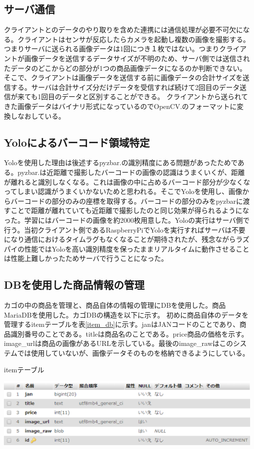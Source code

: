 \newpage

\subsection*{サーバ通信}
クライアントとのデータのやり取りを含めた連携には通信処理が必要不可欠になる。クライアントはセンサが反応したらカメラを起動し複数の画像を撮影する。つまりサーバに送られる画像データは1回につき１枚ではない。つまりクライアントが画像データを送信するデータサイズが不明のため、サーバ側では送信されたデータのどこからどの部分が1つの商品画像データになるのか判断できない。そこで、クライアントは画像データを送信する前に画像データの合計サイズを送信する。サーバは合計サイズ分だけデータを受信すれば続けて2回目のデータ送信が来ても1回目のデータと区別することができる。
クライアントから送られてきた画像データはバイナリ形式になっているのでOpenCV\cite{opencv}.のフォーマットに変換しなおしている。

\subsection*{Yoloによるバーコード領域特定}
Yoloを使用した理由は後述するpyzbar\cite{pyzbar}.の識別精度にある問題があったためである。pyzbar\cite{pyzbar}.は近距離で撮影したバーコードの画像の認識はうまくいくが、距離が離れると識別しなくなる。これは画像の中に占めるバーコード部分が少なくなってしまい認識がうまくいかないためと思われる。そこでYoloを使用し、画像からバーコードの部分のみの座標を取得する。バーコードの部分のみをpyzbarに渡すことで距離が離れていても近距離で撮影したのと同じ効果が得られるようになった。学習にはバーコードの画像を約2000枚用意した。Yoloの実行はサーバ側で行う。当初クライアント側であるRaspberryPiでYoloを実行すればサーバは不要になり通信におけるタイムラグもなくなることが期待されたが、残念ながらラズパイの性能ではYoloを高い識別精度を保ったままリアルタイムに動作させることは性能上難しかったためサーバで行うことになった。

\subsection*{DBを使用した商品情報の管理}
カゴの中の商品を管理と、商品自体の情報の管理にDBを使用した。商品MariaDBを使用した。カゴDBの構造を以下に示す。
初めに商品自体のデータを管理するitemテーブルを表\ref{item_db}に示す。janはJANコードのことであり、商品識別番号のことである。titleは商品名のことである。price商品の価格を示す。
image\_urlは商品の画像があるURLを示している。最後のimage\_rawはこのシステムでは使用していないが、画像データそのものを格納できるようにしている。
\begin{table}[htbp]
\centering
\caption{itemテーブル}
\includegraphics[width=15cm]{./pic/item_db.eps}
\label{item_db}
\end{table}

